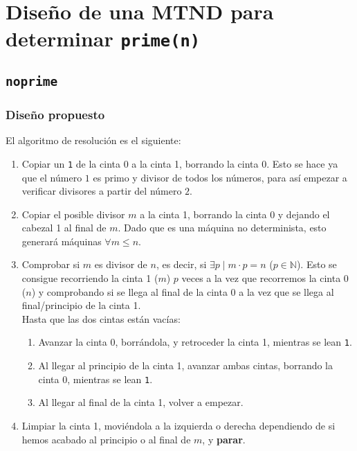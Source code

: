 \section{Diseño de una MTND para determinar \texttt{prime(n)}}


\subsection{\texttt{noprime}}

\subsubsection*{Diseño propuesto}
El algoritmo de resolución es el siguiente:

\begin{enumerate}
    \item Copiar un \texttt{1} de la cinta 0 a la cinta 1, borrando la cinta 0. Esto se hace ya que el número $1$ es primo y divisor de todos los números, para así empezar a verificar divisores a partir del número $2$.
    \item Copiar el posible divisor $m$ a la cinta 1, borrando la cinta 0 y dejando el cabezal 1 al final de $m$. Dado que es una máquina no determinista, esto generará máquinas $\forall m \leq n$.
    \item Comprobar si $m$ es divisor de $n$, es decir, si $\exists p \mid m\cdot p = n$ ($p \in \mathbb{N}$). Esto se consigue recorriendo la cinta 1 ($m$) $p$ veces a la vez que recorremos la cinta 0 ($n$) y comprobando si se llega al final de la cinta 0 a la vez que se llega al final/principio de la cinta 1.\\
    Hasta que las dos cintas están vacías:
    \begin{enumerate}[1.]
        \item Avanzar la cinta 0, borrándola, y retroceder la cinta 1, mientras se lean \texttt{1}.
        \item Al llegar al principio de la cinta 1, avanzar ambas cintas, borrando la cinta 0, mientras se lean \texttt{1}.
        \item Al llegar al final de la cinta 1, volver a empezar.
    \end{enumerate}
    \item Limpiar la cinta 1, moviéndola a la izquierda o derecha dependiendo de si hemos acabado al principio o al final de $m$, y \textbf{parar}.
\end{enumerate}

